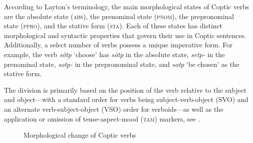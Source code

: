 \documentclass[output=paper,colorlinks,citecolor=brown ,chinesefont]{langscibook}
\begin{document}
According to Layton's terminology, the main morphological states of Coptic verbs are the absolute state (\textsc{abs}), the prenominal state (\textsc{pnom}), the prepronominal state (\textsc{ppro}), and the stative form (\textsc{sta}). Each of these states has distinct morphological and syntactic properties that govern their use in Coptic sentences.
Additionally, a select number of verbs possess a unique imperative form. For example, the verb  \textit{sôtp} ‘choose’ has  \textit{sôtp} in the absolute state,  \textit{setp-} in the prenominal state,  \textit{sotp-} in the prepronominal state, and  \textit{sotp} ‘be chosen’ as the stative form.



The division is primarily based on the position of the verb relative to the subject and object---with a standard order for verbs being subject-verb-object (SVO) and an alternate verb-subject-object (VSO) order for verboids---as well as the application or omission of tense-aspect-mood (\textsc{tam}) markers, see .


\begin{figure}
        \caption{Morphological change of Coptic verbs}
    \label{fig:verbs}
\end{figure}
\end{document}
